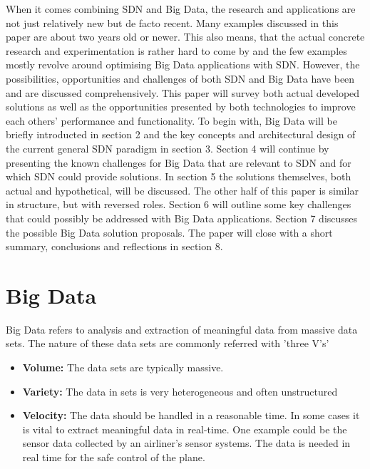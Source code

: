 \documentclass{acm_proc_article-sp}
\begin{document}
When it comes combining SDN and Big Data, the research and applications are not just relatively new but de facto recent. Many examples discussed in this paper are about two years old or newer. This also means, that the actual concrete research and experimentation is rather hard to come by and the few examples mostly revolve around optimising Big Data applications with SDN. However, the possibilities, opportunities and challenges of both SDN and Big Data have been and are discussed comprehensively. This paper will survey both actual developed solutions as well as the opportunities presented by both technologies to improve each others' performance and functionality. To begin with, Big Data will be briefly introducted in section 2 and the key concepts and architectural design of the current general SDN paradigm in section 3. Section 4 will continue by presenting the known challenges for Big Data that are relevant to SDN and for which SDN could provide solutions. In section 5 the solutions themselves, both actual and hypothetical, will be discussed. The other half of this paper is similar in structure, but with reversed roles. Section 6 will outline some key challenges that could possibly be addressed with Big Data applications. Section 7 discusses the possible Big Data solution proposals. The paper will close with a short summary, conclusions and reflections in section 8.  

\section{Big Data}

Big Data refers to analysis and extraction of meaningful data from massive data sets. The nature of these data sets are commonly referred with 'three V's' \cite{Benjamins:2014:BDH:2611040.2611042}

\begin{itemize}
\item \textbf{Volume: } The data sets are typically massive.
\item \textbf{Variety: } The data in sets is very heterogeneous and often unstructured
\item \textbf{Velocity: } The data should be handled in a reasonable time. In some cases it is vital to extract meaningful data in real-time. One example could be the sensor data collected by an airliner's sensor systems. The data is needed in real time for the safe control of the plane.
\end{itemize}
\end{document}
